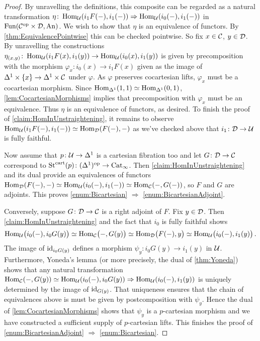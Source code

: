 \begin{proof}
	By unravelling the definitions, this composite can be regarded as a natural transformation $\eta\colon \operatorname{Hom}_{\mathcal{U}}(i_1F(-),i_1(-))\Rightarrow \operatorname{Hom}_{\mathcal{U}}(i_0(-),i_1(-))$ in $\operatorname{Fun}(\mathcal{C}^{\mathrm{op}}\times\mathcal{D},\mathrm{An})$. We wish to show that $\eta$ is an equivalence of functors. By \cref{thm:EquivalencePointwise} this can be checked pointwise. So fix $x\in \mathcal{C}$, $y\in\mathcal{D}$. By unravelling the constructions $\eta_{(x,y)}\colon \operatorname{Hom}_{\mathcal{U}}(i_1F(x),i_1(y))\rightarrow \operatorname{Hom}_{\mathcal{U}}(i_0(x),i_1(y))$ is given by precomposition with the morphism $\varphi_x\colon i_0(x)\rightarrow i_1F(x)$ given as the image of $\Delta^1\times\{x\}\rightarrow \Delta^1\times\mathcal{C}$ under $\varphi$. As $\varphi$ preserves cocartesian lifts, $\varphi_x$ must be a cocartesian morphism. Since $\operatorname{Hom}_{\Delta^1}(1,1)\simeq \operatorname{Hom}_{\Delta^1}(0,1)$, \cref{lem:CocartesianMorphisms} implies that precomposition with $\varphi_x$ must be an equivalence. Thus $\eta$ is an equivalence of functors, as desired. To finish the proof of \cref{claim:HomInUnstraightening}, it remains to observe $\operatorname{Hom}_{\mathcal{U}}(i_1F(-),i_1(-))\simeq \operatorname{Hom}_{\mathcal{D}}(F(-),-)$ as we've checked above that $i_1\colon \mathcal{D}\rightarrow \mathcal{U}$ is fully faithful.
	
	Now assume that $p\colon \mathcal{U}\rightarrow \Delta^1$ is a cartesian fibration too and let $G\colon \mathcal{D}\rightarrow \mathcal{C}$ correspond to $\operatorname{St}^{\mathrm{cart}}(p)\colon (\Delta^1)^{\mathrm{op}}\rightarrow \mathrm{Cat}_\infty$. Then \cref{claim:HomInUnstraightening} and its dual provide an equivalences of functors $\operatorname{Hom}_{\mathcal{D}}(F(-),-)\simeq \operatorname{Hom}_{\mathcal{U}}(i_0(-),i_1(-))\simeq \operatorname{Hom}_{\mathcal{C}}(-,G(-))$, so $F$ and $G$ are adjoints. This proves \cref{enum:Bicartesian} $\Rightarrow$ \cref{enum:BicartesianAdjoint}.
	
	Conversely, suppose $G\colon \mathcal{D}\rightarrow \mathcal{C}$ is a right adjoint of $F$. Fix $y\in \mathcal{D}$. Then \cref{claim:HomInUnstraightening} and the fact that $i_0$ is fully faithful shows
	\begin{equation*}
		\operatorname{Hom}_{\mathcal{U}}\bigl(i_0(-),i_0G(y)\bigr)\simeq \operatorname{Hom}_{\mathcal{C}}\bigl(-,G(y)\bigr)\simeq \operatorname{Hom}_{\mathcal{D}}\bigl(F(-),y\bigr)\simeq \operatorname{Hom}_{\mathcal{U}}\bigl(i_0(-),i_1(y)\bigr)\,.
	\end{equation*}
	The image of $\operatorname{id}_{i_0G(y)}$ defines a morphism $\psi_y\colon i_0G(y)\rightarrow i_1(y)$ in $\mathcal{U}$. Furthermore, Yoneda's lemma (or more precisely, the dual of \cref{thm:Yoneda}) shows that any natural transformation $\operatorname{Hom}_{\mathcal{C}}(-,G(y))\simeq \operatorname{Hom}_{\mathcal{U}}(i_0(-),i_0G(y))\Rightarrow \operatorname{Hom}_{\mathcal{U}}(i_0(-),i_1(y))$ is uniquely determined by the image of $\operatorname{id}_{G(y)}$. That uniqueness ensures that the chain of equivalences above is must be given by postcomposition with $\psi_y$. Hence the dual of \cref{lem:CocartesianMorphisms} shows that $\psi_y$ is a $p$-cartesian morphism and we have constructed a sufficient supply of $p$-cartesian lifts. This finishes the proof of \cref{enum:BicartesianAdjoint} $\Rightarrow$ \cref{enum:Bicartesian}.
\end{proof}

